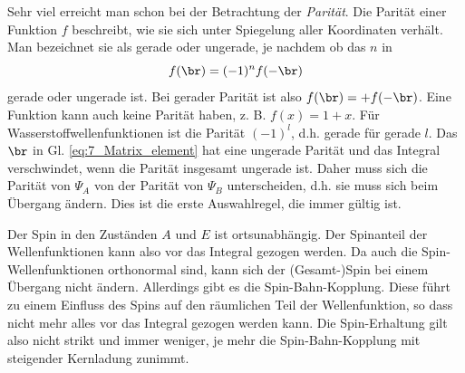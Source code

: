 Sehr viel erreicht man schon bei der Betrachtung der  \emph{Parität}. Die Parität einer Funktion $f$ beschreibt, wie sie sich unter Spiegelung aller Koordinaten verhält. Man bezeichnet sie als gerade oder ungerade, je nachdem ob das $n$ in 
\begin{equation}
    f(\br) = (-1)^n f(- \br)
\end{equation}
gerade oder ungerade ist. Bei gerader Parität ist also $f(\br) = + f(- \br) $.
Eine Funktion kann auch keine Parität haben, z. B. $f(x) = 1 + x$. Für Wasserstoffwellenfunktionen ist die Parität $(-1)^l$, d.h. gerade für gerade $l$. Das $\br$ in Gl. \ref{eq:7_Matrix_element} hat eine ungerade Parität und das Integral verschwindet, wenn die Parität insgesamt ungerade ist. Daher muss sich die Parität von $\Psi_A$ von der Parität von $\Psi_B$ unterscheiden, d.h. sie muss sich beim Übergang ändern. Dies ist die erste Auswahlregel, die immer gültig ist.

Der Spin in den Zuständen $A$ und $E$ ist ortsunabhängig. Der Spinanteil der Wellenfunktionen kann also vor das Integral gezogen werden. Da auch die Spin-Wellenfunktionen orthonormal sind, kann sich der (Gesamt-)Spin bei einem Übergang nicht ändern. Allerdings gibt es die Spin-Bahn-Kopplung. Diese führt zu einem Einfluss des Spins auf den räumlichen Teil der Wellenfunktion, so dass nicht mehr alles vor das Integral gezogen werden kann. Die Spin-Erhaltung gilt also nicht strikt und immer weniger, je mehr die Spin-Bahn-Kopplung mit steigender Kernladung zunimmt.

\newpage

